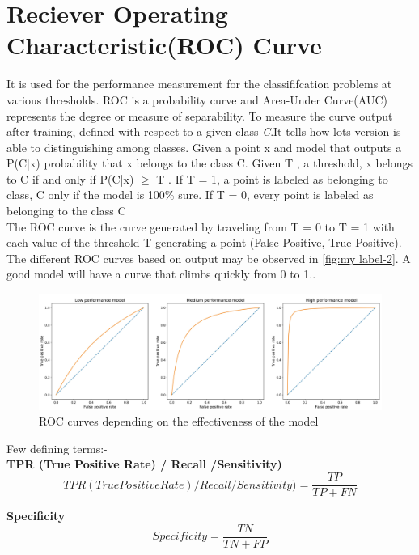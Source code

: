 \section{Reciever Operating Characteristic(ROC) Curve}\label{sec:ROC_Curve}
It is used for the performance measurement for the classififcation problems at various thresholds. ROC is a probability curve and Area-Under Curve(AUC) represents the degree or measure of separability\cite{BRADLEY19971145}. To measure the curve output after training, defined with respect to a given class \textit{C}.It tells how lots version is able to distinguishing among classes. Given a point x and model that outputs a P(C|x) probability that x belongs to the class C. Given T , a threshold, x belongs to C if and only if P(C|x) $\geq$ T . If T = 1, a point is labeled as belonging to class, C only if the model is 100\% sure. If T = 0, every point is labeled as belonging to the class C\\
The ROC curve is the curve generated by traveling from T = 0 to T = 1 with each value of the threshold T generating a point (False Positive, True Positive)\cite{Melo2013, Hajian-Tilaki2013}. The different ROC curves based on output may be observed in \autoref{fig:my label-2}. A good model will have a curve that climbs quickly from 0 to 1.. 
\begin{figure}[H]
    \centering
    \includegraphics[scale=0.3]{Figure/13__ml.png}
    \caption{ROC curves depending on the effectiveness of the model}
    \label{fig:my_label-2}
\end{figure}

Few defining terms:-\\
\textbf{TPR (True Positive Rate) / Recall /Sensitivity)} \\

\begin{equation*}
    TPR (True Positive Rate) / Recall /Sensitivity) = \frac{TP}{TP+FN}
\end{equation*}

\textbf{Specificity}\\
\begin{equation*}
    Specificity = \frac{TN}{TN+FP}
\end{equation*}

